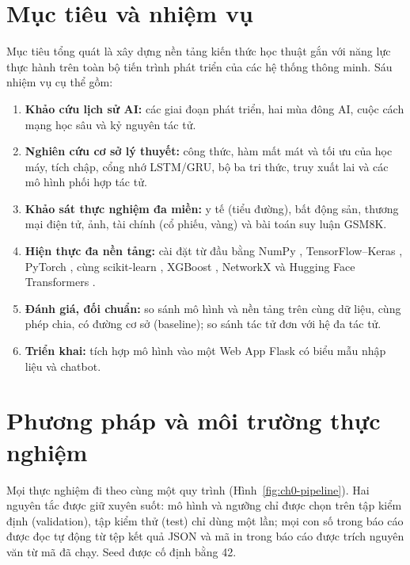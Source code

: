 \section*{Mục tiêu và nhiệm vụ}
Mục tiêu tổng quát là xây dựng nền tảng kiến thức học thuật gắn với năng lực thực hành trên toàn bộ tiến trình phát triển của các
hệ thống thông minh. Sáu nhiệm vụ cụ thể gồm:

\begin{enumerate}
  \item \textbf{Khảo cứu lịch sử AI:} các giai đoạn phát triển, hai mùa đông AI, cuộc cách mạng học sâu và kỷ nguyên tác tử.
  \item \textbf{Nghiên cứu cơ sở lý thuyết:} công thức, hàm mất mát và tối ưu của học máy, tích chập, cổng nhớ LSTM/GRU, bộ ba
        tri thức, truy xuất lai và các mô hình phối hợp tác tử.
  \item \textbf{Khảo sát thực nghiệm đa miền:} y tế (tiểu đường), bất động sản, thương mại điện tử, ảnh, tài chính (cổ phiếu,
        vàng) và bài toán suy luận GSM8K.
  \item \textbf{Hiện thực đa nền tảng:} cài đặt từ đầu bằng NumPy \cite{ch0:harris2020}, TensorFlow--Keras
        \cite{ch0:abadi2016,ch0:chollet2015}, PyTorch \cite{ch0:paszke2019}, cùng scikit-learn \cite{ch0:pedregosa2011}, XGBoost
        \cite{ch0:chen2016}, NetworkX \cite{ch0:hagberg2008} và Hugging Face Transformers \cite{ch0:wolf2020}.
  \item \textbf{Đánh giá, đối chuẩn:} so sánh mô hình và nền tảng trên cùng dữ liệu, cùng phép chia, có đường cơ sở (baseline);
        so sánh tác tử đơn với hệ đa tác tử.
  \item \textbf{Triển khai:} tích hợp mô hình vào một Web App Flask có biểu mẫu nhập liệu và chatbot.
\end{enumerate}

\section*{Phương pháp và môi trường thực nghiệm}
Mọi thực nghiệm đi theo cùng một quy trình (Hình~\ref{fig:ch0-pipeline}). Hai nguyên tắc được giữ xuyên suốt: mô hình và ngưỡng
chỉ được chọn trên tập kiểm định (validation), tập kiểm thử (test) chỉ dùng một lần; mọi con số trong báo cáo được đọc tự động từ
tệp kết quả JSON và mã in trong báo cáo được trích nguyên văn từ mã đã chạy. Seed được cố định bằng 42.


